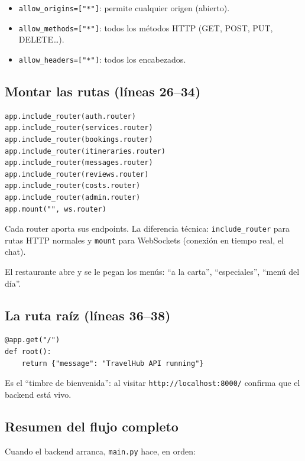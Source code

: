 \documentclass[11pt,a4paper]{article}
\begin{document}
\begin{itemize}
    \item \texttt{allow\_origins=["*"]}: permite cualquier origen (abierto).
    \item \texttt{allow\_methods=["*"]}: todos los métodos HTTP (GET, POST, PUT, DELETE\ldots).
    \item \texttt{allow\_headers=["*"]}: todos los encabezados.
\end{itemize}

\subsection{Montar las rutas (líneas 26--34)}

\begin{lstlisting}
app.include_router(auth.router)
app.include_router(services.router)
app.include_router(bookings.router)
app.include_router(itineraries.router)
app.include_router(messages.router)
app.include_router(reviews.router)
app.include_router(costs.router)
app.include_router(admin.router)
app.mount("", ws.router)
\end{lstlisting}

Cada router aporta sus endpoints. La diferencia técnica: \texttt{include\_router} para rutas HTTP
normales y \texttt{mount} para WebSockets (conexión en tiempo real, el chat).

\begin{analogia}
El restaurante abre y se le pegan los menús: ``a la carta'', ``especiales'', ``menú del día''.
\end{analogia}

\subsection{La ruta raíz (líneas 36--38)}

\begin{lstlisting}
@app.get("/")
def root():
    return {"message": "TravelHub API running"}
\end{lstlisting}

Es el ``timbre de bienvenida'': al visitar \texttt{http://localhost:8000/} confirma que el backend está vivo.

\subsection{Resumen del flujo completo}

Cuando el backend arranca, \texttt{main.py} hace, en orden:
\end{document}
